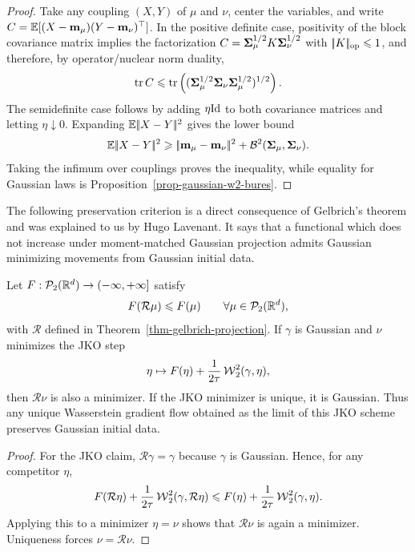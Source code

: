 \begin{proof}
	Take any coupling $(X,Y)$ of $\mu$ and $\nu$, center the variables, and write $C=\mathbb{E}[(X-\mathbf{m}_\mu)(Y-\mathbf{m}_\nu)^\top]$. In the positive definite case, positivity of the block covariance matrix implies the factorization $C=\mathbf{\Sigma}_\mu^{1/2}K\mathbf{\Sigma}_\nu^{1/2}$ with $|\!| K |\!|_{\mathrm{op}}\leqslant1$, and therefore, by operator/nuclear norm duality,
	\[
		\operatorname{tr} C\leqslant \operatorname{tr}\left((\mathbf{\Sigma}_\mu^{1/2}\mathbf{\Sigma}_\nu\mathbf{\Sigma}_\mu^{1/2})^{1/2}\right).
	\]
	The semidefinite case follows by adding $\eta\mathrm{Id}$ to both covariance matrices and letting $\eta\downarrow0$.
	Expanding $\mathbb{E}|\!| X-Y |\!|^2$ gives the lower bound
	\[
		\mathbb{E}|\!| X-Y |\!|^2
		\geqslant
		|\!| \mathbf{m}_\mu-\mathbf{m}_\nu |\!|^2+\mathcal{B}^2(\mathbf{\Sigma}_\mu,\mathbf{\Sigma}_\nu).
	\]
	Taking the infimum over couplings proves the inequality, while equality for Gaussian laws is Proposition~\ref{prop-gaussian-w2-bures}.
\end{proof}

The following preservation criterion is a direct consequence of Gelbrich's theorem and was explained to us by Hugo Lavenant. It says that a functional which does not increase under moment-matched Gaussian projection admits Gaussian minimizing movements from Gaussian initial data.

\begin{thm}\label{thm-lavenant-gaussian-preserving-jko}
	Let $F:\mathcal{P}_2(\mathbb{R}^d)\to(-\infty,+\infty]$ satisfy
	\[
		F(\mathcal R\mu)\leqslant F(\mu)
		\qquad\forall\mu\in\mathcal{P}_2(\mathbb{R}^d),
	\]
	with $\mathcal R$ defined in Theorem~\ref{thm-gelbrich-projection}. If $\gamma$ is Gaussian and $\nu$ minimizes the JKO step
	\[
		\eta\mapsto F(\eta)+\frac1{2\tau}\operatorname{\mathcal{W}}_2^2(\gamma,\eta),
	\]
	then $\mathcal R\nu$ is also a minimizer. If the JKO minimizer is unique, it is Gaussian. Thus any unique Wasserstein gradient flow obtained as the limit of this JKO scheme preserves Gaussian initial data.
\end{thm}

\begin{proof}
	For the JKO claim, $\mathcal R\gamma=\gamma$ because $\gamma$ is Gaussian. Hence, for any competitor $\eta$,
	\[
		F(\mathcal R\eta)+\frac1{2\tau}\operatorname{\mathcal{W}}_2^2(\gamma,\mathcal R\eta)
		\leqslant
		F(\eta)+\frac1{2\tau}\operatorname{\mathcal{W}}_2^2(\gamma,\eta).
	\]
	Applying this to a minimizer $\eta=\nu$ shows that $\mathcal R\nu$ is again a minimizer. Uniqueness forces $\nu=\mathcal R\nu$.
\end{proof}

